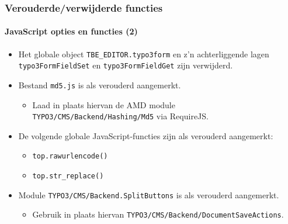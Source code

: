 \begin{frame}[fragile]
	\frametitle{Verouderde/verwijderde functies}
	\framesubtitle{JavaScript opties en functies (2)}

	\begin{itemize}

		\item Het globale object \texttt{TBE\_EDITOR.typo3form} en z'n achterliggende lagen \texttt{typo3FormFieldSet}
			en \texttt{typo3FormFieldGet} zijn verwijderd.

		\item Bestand \texttt{md5.js} is als verouderd aangemerkt.

			\begin{itemize}\smaller
				\item[\ding{228}] Laad in plaats hiervan de AMD module \texttt{TYPO3/CMS/Backend/Hashing/Md5} via RequireJS.
			\end{itemize}\normalsize

		\item De volgende globale JavaScript-functies zijn als verouderd aangemerkt:

		\begin{itemize}
			\item \texttt{top.rawurlencode()}
			\item \texttt{top.str\_replace()}
		\end{itemize}

		\item Module \texttt{TYPO3/CMS/Backend.SplitButtons} is als verouderd aangemerkt.

			\begin{itemize}\smaller
				\item[\ding{228}] Gebruik in plaats hiervan \texttt{TYPO3/CMS/Backend/DocumentSaveActions}.
			\end{itemize}\normalsize

 	\end{itemize}

\end{frame}


